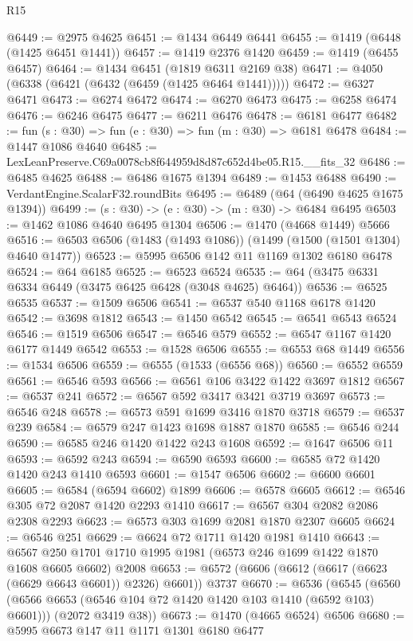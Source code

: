 \begin{lexlean}{R15}
\begin{coremodule}
@6449 := @2975 @4625
@6451 := @1434 @6449 @6441
@6455 := @1419 (@6448 (@1425 @6451 @1441))
@6457 := @1419 @2376 @1420
@6459 := @1419 (@6455 @6457)
@6464 := @1434 @6451 (@1819 @6311 @2169 @38)
@6471 := @4050 (@6338 (@6421 (@6432 (@6459 (@1425 @6464 @1441)))))
@6472 := @6327 @6471
@6473 := @6274 @6472
@6474 := @6270 @6473
@6475 := @6258 @6474
@6476 := @6246 @6475
@6477 := @6211 @6476
@6478 := @6181 @6477
@6482 := fun (s : @30) => fun (e : @30) => fun (m : @30) => @6181 @6478
@6484 := @1447 @1086 @4640
@6485 := LexLeanPreserve.C69a0078cb8f644959d8d87c652d4be05.R15.__fits_32
@6486 := @6485 @4625
@6488 := @6486 @1675 @1394
@6489 := @1453 @6488
@6490 := VerdantEngine.ScalarF32.roundBits
@6495 := @6489 (@64 (@6490 @4625 @1675 @1394))
@6499 := (s : @30) -> (e : @30) -> (m : @30) -> @6484 @6495
@6503 := @1462 @1086 @4640 @6495 @1304
@6506 := @1470 (@4668 @1449) @5666
@6516 := @6503 @6506 (@1483 (@1493 @1086)) (@1499 (@1500 (@1501 @1304) @4640 @1477))
@6523 := @5995 @6506 @142 @11 @1169 @1302 @6180 @6478
@6524 := @64 @6185
@6525 := @6523 @6524
@6535 := @64 (@3475 @6331 @6334 @6449 (@3475 @6425 @6428 (@3048 @4625) @6464))
@6536 := @6525 @6535
@6537 := @1509 @6506
@6541 := @6537 @540 @1168 @6178 @1420
@6542 := @3698 @1812
@6543 := @1450 @6542
@6545 := @6541 @6543 @6524
@6546 := @1519 @6506
@6547 := @6546 @579
@6552 := @6547 @1167 @1420 @6177 @1449 @6542
@6553 := @1528 @6506
@6555 := @6553 @68 @1449
@6556 := @1534 @6506
@6559 := @6555 (@1533 (@6556 @68))
@6560 := @6552 @6559
@6561 := @6546 @593
@6566 := @6561 @106 @3422 @1422 @3697 @1812
@6567 := @6537 @241
@6572 := @6567 @592 @3417 @3421 @3719 @3697
@6573 := @6546 @248
@6578 := @6573 @591 @1699 @3416 @1870 @3718
@6579 := @6537 @239
@6584 := @6579 @247 @1423 @1698 @1887 @1870
@6585 := @6546 @244
@6590 := @6585 @246 @1420 @1422 @243 @1608
@6592 := @1647 @6506 @11
@6593 := @6592 @243
@6594 := @6590 @6593
@6600 := @6585 @72 @1420 @1420 @243 @1410 @6593
@6601 := @1547 @6506
@6602 := @6600 @6601
@6605 := @6584 (@6594 @6602) @1899
@6606 := @6578 @6605
@6612 := @6546 @305 @72 @2087 @1420 @2293 @1410
@6617 := @6567 @304 @2082 @2086 @2308 @2293
@6623 := @6573 @303 @1699 @2081 @1870 @2307 @6605
@6624 := @6546 @251
@6629 := @6624 @72 @1711 @1420 @1981 @1410
@6643 := @6567 @250 @1701 @1710 @1995 @1981 (@6573 @246 @1699 @1422 @1870 @1608 @6605 @6602) @2008
@6653 := @6572 (@6606 (@6612 (@6617 (@6623 (@6629 @6643 @6601)) @2326) @6601)) @3737
@6670 := @6536
    (@6545
      (@6560 (@6566 @6653 (@6546 @104 @72 @1420 @1420 @103 @1410 (@6592 @103) @6601)))
      (@2072 @3419 @38))
@6673 := @1470 (@4665 @6524) @6506
@6680 := @5995 @6673 @147 @11 @1171 @1301 @6180 @6477

\end{coremodule}
\end{lexlean}

